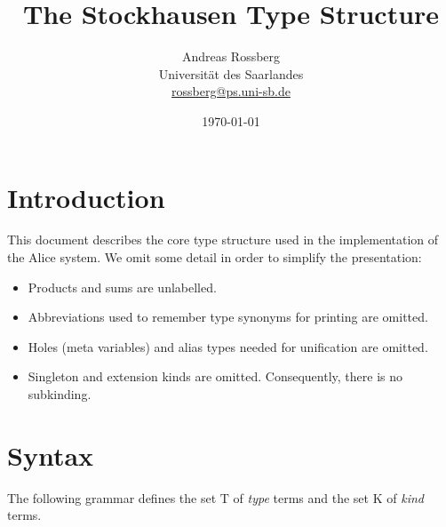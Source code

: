 \documentclass[twoside]{article}
\newcommand{\f}[1]{\mbox{#1}}
\begin{document}

\title{The Stockhausen Type Structure}
\author{Andreas Rossberg \\
Universit\"at des Saarlandes \\
\url{rossberg@ps.uni-sb.de}}
\date{\today}

\maketitle


\section{Introduction}
\label{intro}

This document describes the core type structure used in the implementation of the Alice system. We omit some detail in order to simplify the presentation:

\begin{itemize}
\setlength{\parskip}{0ex}
\item Products and sums are unlabelled.
\item Abbreviations used to remember type synonyms for printing are omitted.
\item Holes (meta variables) and alias types needed for unification are omitted.
\item Singleton and extension kinds are omitted. Consequently, there is no subkinding.
\end{itemize}


\section{Syntax}
\label{coresyntax}

The following grammar defines the set $\f{T}$ of {\em type} terms and the set $\f{K}$ of {\em kind} terms.
\end{document}
